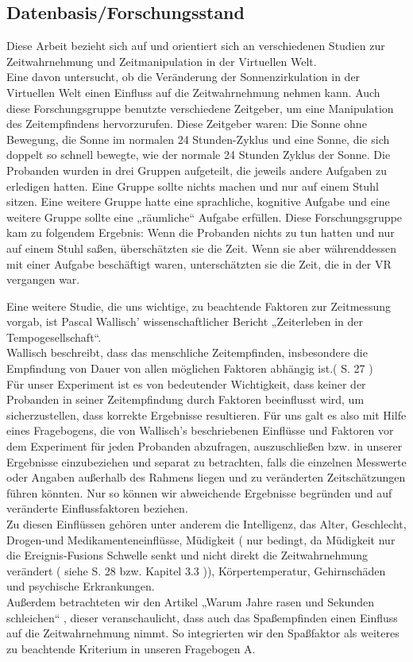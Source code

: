 \documentclass{Paper}
\begin{document}
\subsection{Datenbasis/Forschungsstand}
Diese Arbeit bezieht sich auf und orientiert sich an verschiedenen Studien zur Zeitwahrnehmung und Zeitmanipulation in der Virtuellen Welt. \\
Eine davon untersucht, ob die Veränderung der Sonnenzirkulation in der Virtuellen Welt einen Einfluss auf die Zeitwahrnehmung nehmen kann. Auch diese Forschungsgruppe benutzte verschiedene Zeitgeber, um eine Manipulation des Zeitempfindens hervorzurufen. Diese Zeitgeber waren: Die Sonne ohne Bewegung, die Sonne im normalen 24 Stunden-Zyklus und eine Sonne, die sich doppelt so schnell bewegte, wie der normale 24 Stunden Zyklus der Sonne. Die Probanden wurden in drei Gruppen aufgeteilt, die jeweils andere Aufgaben zu erledigen hatten. Eine Gruppe sollte nichts machen und nur auf einem Stuhl sitzen. Eine weitere Gruppe hatte eine sprachliche, kognitive Aufgabe und eine weitere Gruppe sollte eine „räumliche“ Aufgabe erfüllen.
Diese Forschungsgruppe kam zu folgendem Ergebnis: Wenn die Probanden nichts zu tun hatten und nur auf einem Stuhl saßen, überschätzten sie die Zeit. Wenn sie aber währenddessen mit einer Aufgabe beschäftigt waren, unterschätzten sie die Zeit, die in der VR vergangen war.
\par
Eine weitere Studie, die uns wichtige, zu beachtende Faktoren zur Zeitmessung vorgab, ist Pascal Wallisch' wissenschaftlicher Bericht „Zeiterleben in der Tempogesellschaft“.  \\
Wallisch beschreibt, \glqq dass das menschliche Zeitempfinden, insbesondere die Empfindung von Dauer von allen möglichen Faktoren abhängig ist\grqq .( S. 27 ) \\
Für unser Experiment ist es von bedeutender Wichtigkeit, dass keiner der Probanden in seiner Zeitempfindung durch Faktoren beeinflusst wird, um sicherzustellen, dass korrekte Ergebnisse resultieren.
Für uns galt es also mit Hilfe eines Fragebogens, die von Wallisch’s beschriebenen Einflüsse und Faktoren vor dem Experiment für jeden Probanden abzufragen, auszuschließen bzw. in unserer Ergebnisse einzubeziehen und separat zu betrachten, falls die einzelnen Messwerte oder Angaben außerhalb des Rahmens liegen und zu veränderten Zeitschätzungen führen könnten. Nur so können wir abweichende Ergebnisse begründen und auf veränderte Einflussfaktoren beziehen.\\
Zu diesen Einflüssen gehören unter anderem die Intelligenz, das Alter, Geschlecht, Drogen-und Medikamenteneinflüsse, Müdigkeit ( nur bedingt, da Müdigkeit nur die Ereignis-Fusions Schwelle senkt und nicht direkt die Zeitwahrnehmung verändert ( siehe S. 28 bzw. Kapitel 3.3 )), Körpertemperatur, Gehirnschäden und psychische Erkrankungen.
\\Außerdem betrachteten wir den Artikel „Warum Jahre rasen und Sekunden schleichen“ , dieser veranschaulicht, dass auch das Spaßempfinden einen Einfluss auf die Zeitwahrnehmung nimmt. So integrierten wir den Spaßfaktor als weiteres zu beachtende Kriterium in unseren Fragebogen A.
\end{document}
